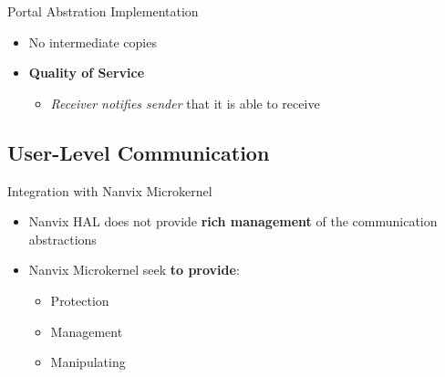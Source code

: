 		\begin{frame}[fragile]{Portal Abstration Implementation}
			\begin{itemize}
				\item No intermediate copies
				\item \textbf{Quality of Service}
				\begin{itemize}
					\item \textit{Receiver notifies sender} that it is able to receive
				\end{itemize}
			\end{itemize}


		\end{frame}

	\subsection{User-Level Communication}

		\begin{frame}[fragile]{Integration with Nanvix Microkernel}
			\begin{itemize}
				\item Nanvix HAL does not provide \textbf{rich management} of the communication abstractions
				\item Nanvix Microkernel seek \textbf{to provide}:
				\begin{itemize}
					\item Protection
					\item Management
					\item Manipulating
				\end{itemize}
			\end{itemize}

		\end{frame}

